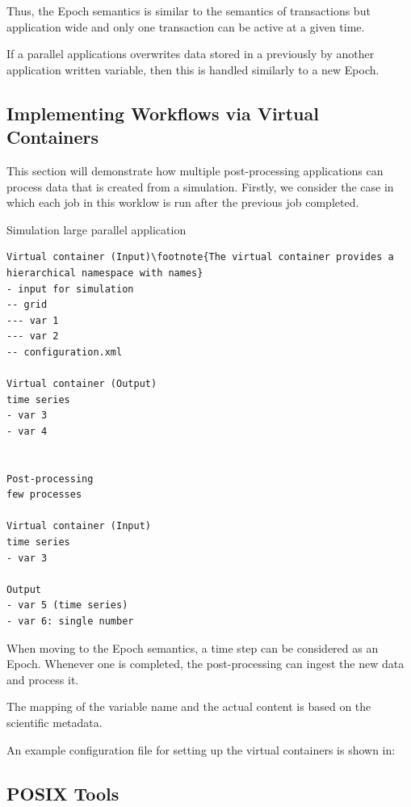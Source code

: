 \documentclass{../../template/esiwace-report}
\begin{document}
Thus, the Epoch semantics is similar to the semantics of transactions but application wide and only one transaction can be active at a given time.

If a parallel applications overwrites data stored in a previously by another application written variable, then this is handled similarly to a new Epoch.


\subsection{Implementing Workflows via Virtual Containers}

This section will demonstrate how multiple post-processing applications can process data that is created from a simulation.
Firstly, we consider the case in which each job in this worklow is run after the previous job completed.

Simulation 
large parallel application


\begin{verbatim}
Virtual container (Input)\footnote{The virtual container provides a hierarchical namespace with names}
- input for simulation
-- grid
--- var 1 
--- var 2
-- configuration.xml

Virtual container (Output)
time series
- var 3
- var 4


Post-processing
few processes

Virtual container (Input)
time series
- var 3

Output
- var 5 (time series)
- var 6: single number
\end{verbatim}



When moving to the Epoch semantics, a time step can be considered as an Epoch.
Whenever one is completed, the post-processing can ingest the new data and process it.

The mapping of the variable name and the actual content is based on the scientific metadata.

An example configuration file for setting up the virtual containers is shown in:



\subsection{POSIX Tools}
\end{document}
